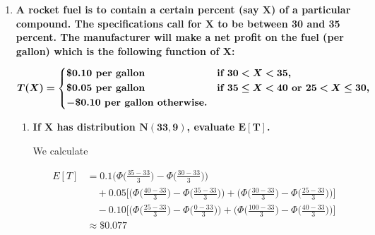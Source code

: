 \documentclass[10pt, oneside]{article}
\begin{document}
\begin{enumerate}[label=9.\arabic*]
\begin{enumerate}
\begin{proof}
	\begin{align*}
	VZ &= (X_1 \cos (\omega t) + X_2 \sin (\omega t))(-X_1 \omega \sin (\omega t) + X_2 \omega \cos (\omega t)) \\
	&= X_1 X_2 \omega \cos^2 (\omega t) - X^2_1 \omega \sin (\omega t) \cos (\omega t) +  X^2_2 \omega \sin (\omega t) \cos (\omega t) - X_1 X_2 \omega \sin^2 (\omega t) \\
	E[VZ] &= \mu^2 \omega (\cos^2 (\omega t) - \sin^2 (\omega t))
	\end{align*}
	
	Therefore, $E[VZ] - E[V] E[Z] = 0$, implying $\boxed{ \rho = 0 }$ and that $Z(t), V(t)$ are uncorrelated.
	\end{proof}
	\end{enumerate}

\item  \begin{tcolorbox}[
  colback=Cerulean!5!white,
  colframe=Cerulean!75!black]
\textbf{A rocket fuel is to contain a certain percent (say $\bm{X}$) of a particular compound. The specifications call for $\bm{X}$ to be between 30 and 35 percent. The manufacturer will make a net profit on the fuel (per gallon) which is the following function of $\bm{X}$:}

\[ \bm{T(X) = }
\begin{dcases} 
\bm{\$ 0.10} \textbf{ per gallon} & \textbf{if } \bm{30 < X < 35,} \\
\bm{\$ 0.05} \textbf{ per gallon} & \textbf{if } \bm{35 \leq X < 40} \textbf{ or } \bm{25 < X \leq 30,} \\
\bm{-\$ 0.10} \textbf{ per gallon otherwise.}
\end{dcases}
\]
\end{tcolorbox}

	\begin{enumerate}
	\item  \begin{tcolorbox}[
	  colback=Cerulean!5!white,
	  colframe=Cerulean!75!black]
	\textbf{If $\bm{X}$ has distribution $\bm{N(33,9)}$, evaluate $\bm{E[T]}$.}
	\end{tcolorbox}
	
	We calculate
	
	\begin{align*}
	E[T] &= 0.1 \bigg( \Phi \bigg( \frac{35-33}{3} \bigg) - \Phi \bigg( \frac{30-33}{3} \bigg) \bigg) \\
	&\quad + 0.05 \bigg[ \bigg( \Phi \bigg( \frac{40-33}{3} \bigg) - \Phi \bigg( \frac{35-33}{3} \bigg) \bigg) + \bigg( \Phi \bigg( \frac{30-33}{3} \bigg) - \Phi \bigg( \frac{25-33}{3} \bigg) \bigg) \bigg] \\
	&\quad -0.10 \bigg[ \bigg( \Phi \bigg( \frac{25-33}{3} \bigg) - \Phi \bigg( \frac{0-33}{3} \bigg) \bigg) + \bigg( \Phi \bigg( \frac{100-33}{3} \bigg) - \Phi \bigg( \frac{40-33}{3} \bigg) \bigg) \bigg] \\
	&\approx \boxed{\$ 0.077}
	\end{align*}
	

\end{enumerate}
\end{enumerate}
\end{document}
